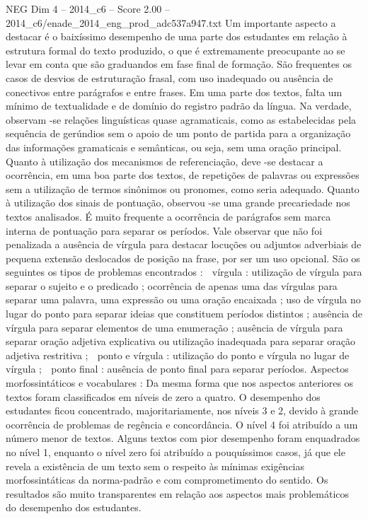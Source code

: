 \begin{textsample}{NEG Dim 4 – 2014\_c6 – Score 2.00 – 2014\_c6/enade\_2014\_eng\_prod\_adc537a947.txt}
Um importante aspecto a destacar é o baixíssimo desempenho de uma parte dos estudantes em relação à estrutura formal do texto produzido, o que é extremamente preocupante ao se levar em conta que são graduandos em fase final de formação.
São frequentes os casos de desvios de estruturação frasal, com uso inadequado ou ausência de conectivos entre parágrafos e entre frases.
Em uma parte dos textos, falta um mínimo de textualidade e de domínio do registro padrão da língua.
Na verdade, observam -se relações linguísticas quase agramaticais, como as estabelecidas pela sequência de gerúndios sem o apoio de um ponto de partida para a organização das informações gramaticais e semânticas, ou seja, sem uma oração principal.
Quanto à utilização dos mecanismos de referenciação, deve -se destacar a ocorrência, em uma boa parte dos textos, de repetições de palavras ou expressões sem a utilização de termos sinônimos ou pronomes, como seria adequado.
Quanto à utilização dos sinais de pontuação, observou -se uma grande precariedade nos textos analisados.
É muito frequente a ocorrência de parágrafos sem marca interna de pontuação para separar os períodos.
Vale observar que não foi penalizada a ausência de vírgula para destacar locuções ou adjuntos adverbiais de pequena extensão deslocados de posição na frase, por ser um uso opcional.
São os seguintes os tipos de problemas encontrados :  vírgula : utilização de vírgula para separar o sujeito e o predicado ; ocorrência de apenas uma das vírgulas para separar uma palavra, uma expressão ou uma oração encaixada ; uso de vírgula no lugar do ponto para separar ideias que constituem períodos distintos ; ausência de vírgula para separar elementos de uma enumeração ; ausência de vírgula para separar oração adjetiva explicativa ou utilização inadequada para separar oração adjetiva restritiva ;  ponto e vírgula : utilização do ponto e vírgula no lugar de vírgula ;  ponto final : ausência de ponto final para separar períodos.
Aspectos morfossintáticos e vocabulares : Da mesma forma que nos aspectos anteriores os textos foram classificados em níveis de zero a quatro.
O desempenho dos estudantes ficou concentrado, majoritariamente, nos níveis 3 e 2, devido à grande ocorrência de problemas de regência e concordância.
O nível 4 foi atribuído a um número menor de textos.
Alguns textos com pior desempenho foram enquadrados no nível 1, enquanto o nível zero foi atribuído a pouquíssimos casos, já que ele revela a existência de um texto sem o respeito às mínimas exigências morfossintáticas da norma-padrão e com comprometimento do sentido.
Os resultados são muito transparentes em relação aos aspectos mais problemáticos do desempenho dos estudantes.

\end{textsample}
